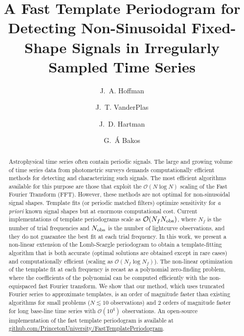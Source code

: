 \documentclass{aastex62}
\newcommand{\bigO}{\mathcal{O}}
\begin{document}
\title{A Fast Template Periodogram for Detecting Non-Sinusoidal Fixed-Shape Signals in Irregularly Sampled Time Series}


\author[0000-0003-3770-5541]{J.~A. Hoffman}

\author[0000-0002-9623-3401]{J.~T. VanderPlas}

\author[0000-0001-8732-6166]{J.~D. Hartman}

\author[0000-0001-7204-6727]{G.~\'A Bakos}

\begin{abstract}
    Astrophysical time series often contain periodic signals. The large and growing volume of time series data from
    photometric surveys demands computationally efficient methods for detecting and characterizing such signals.
    The most efficient algorithms available for this purpose are those that exploit the
    $\bigO(N\log N)$ scaling of the Fast Fourier Transform (FFT). However, these methods are not optimal
    for non-sinusoidal signal shapes. Template fits (or periodic matched filters) optimize
    sensitivity for \emph{a priori} known signal shapes but at enormous computational cost. Current
    implementations of template periodograms scale as $\bigO(N_f N_{\rm obs})$, where $N_f$ is the number
    of trial frequencies and $N_{\rm obs}$ is the number of lightcurve observations, and they do not
    guarantee the best fit at each trial frequency. In this work, we present a non-linear extension of the Lomb-Scargle
    periodogram to obtain a template-fitting algorithm that is both accurate (optimal solutions are
    obtained except in rare cases) and computationally efficient (scaling as $\bigO(N_f\log N_f)$).
    The non-linear optimization of the template fit at each frequency is recast as a polynomial
    zero-finding problem, where the coefficients of the polynomial can be computed efficiently with
    the non-equispaced fast Fourier transform. We show that our method, which uses truncated Fourier series to approximate templates,
    is an order of magnitude faster than existing algorithms for small problems ($N\lesssim 10$ observations) and
    2 orders of magnitude faster for long base-line time series with $\bigO(10^4)$ observations.
    An open-source implementation of the fast template periodogram is available at
    \href{https://www.github.com/PrincetonUniversity/FastTemplatePeriodogram}{github.com/PrincetonUniversity/FastTemplatePeriodogram}.
\end{abstract}
\end{document}
